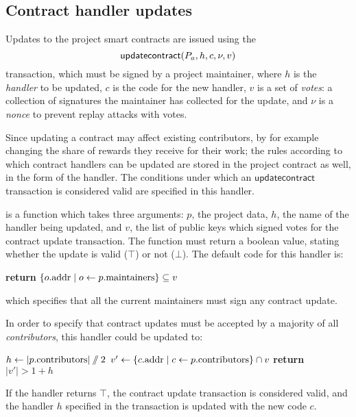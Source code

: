 \subsection{Contract handler updates}

Updates to the project smart contracts are issued using the
\[
    \mathsf{updatecontract}\lparen P_a, h, c, \nu, v\rparen
\]
transaction, which must be signed by a project maintainer, where $h$ is the
\emph{handler} to be updated, $c$ is the code for the new handler, $v$ is a set
of \emph{votes}: a collection of signatures the maintainer has collected for the
update, and $\nu$ is a \emph{nonce} to prevent replay attacks with votes.

Since updating a contract may affect existing contributors, by for example
changing the share of rewards they receive for their work; the rules according
to which contract handlers can be updated are stored in the project contract
as well, in the form of the  handler.  The
conditions under which an $\mathsf{updatecontract}$ transaction is considered
valid are specified in this handler.

 is a function which takes three arguments: $p$,
the project data, $h$, the name of the handler being updated, and $v$, the list
of public keys which signed votes for the contract update transaction. The
function must return a boolean value, stating whether the update is valid ($\top$)
or not ($\bot$). The default code for this handler is:
\begin{algorithmic}[0]
        \State \textbf{return} $\{ o.{\mathrm{addr}} \mid o \gets p.{\mathrm{maintainers}} \} \subseteq v$
    \EndProcedure
\end{algorithmic}
which specifies that all the current maintainers must sign any contract update.

In order to specify that contract updates must be accepted by a majority of all
\emph{contributors}, this handler could be updated to:
\begin{algorithmic}[0]
        \State $h \gets |p.{\mathrm{contributors}}| \sslash 2$
        \State $v' \gets \{ c.{\mathrm{addr}} \mid c \gets p.{\mathrm{contributors}} \} \cap v$
        \State \textbf{return} $|v'| > 1 + h$
    \EndProcedure
\end{algorithmic}
If the handler returns $\top$, the contract update transaction is considered
valid, and the handler $h$ specified in the transaction is updated with the new code
$c$.

